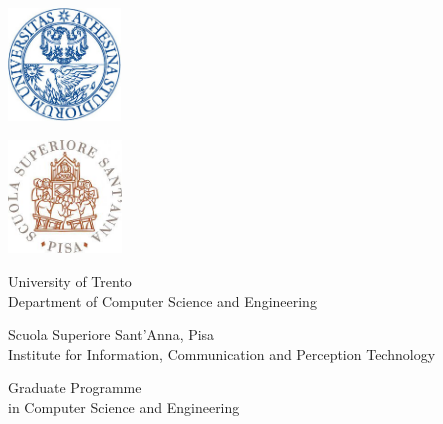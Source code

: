 \documentclass[11pt,a4paper,twoside,titlepage,openany]{book}
\begin{document}
\begin{titlepage}

  \begin{center}
    \noindent\begin{minipage}{.65\textwidth} 
      \begin{minipage}{0.5\textwidth}
        \centering
        \includegraphics[height=3cm]{img/logo_unitn_blu.jpg}  %
      \end{minipage}%
      \begin{minipage}{0.5\textwidth}
        \centering 
        \includegraphics[height=3cm]{img/logo_santanna.jpg}
      \end{minipage} 
    \end{minipage}
    \vspace{1cm}

    \LARGE{University of Trento}\\
    \Large{Department of Computer Science and Engineering}

    \vspace{.5cm}

    \LARGE{Scuola Superiore Sant'Anna, Pisa}\\
    \Large{Institute for Information, Communication and Perception Technology}

    \vspace{1 cm} 
    \Large{Graduate Programme\\
      in Computer Science and Engineering
    }


\end{center}
\end{titlepage}
\end{document}
